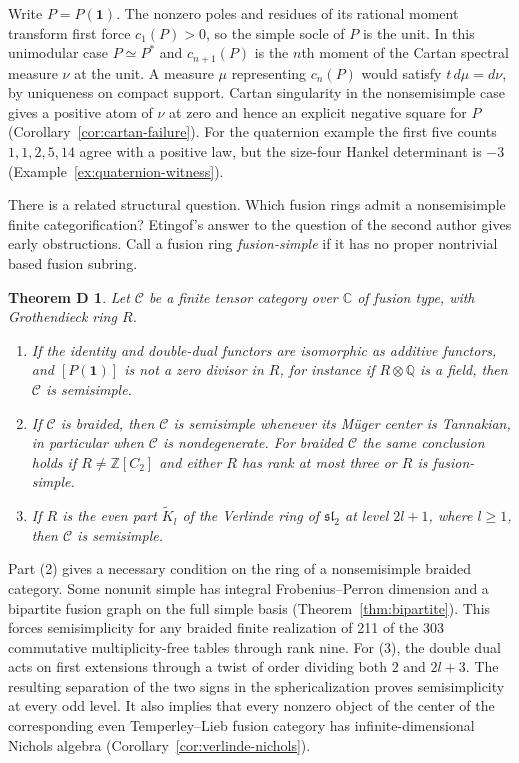 \documentclass[11pt,reqno]{amsart}
\newtheorem*{theoremD}{Theorem D}
\theoremstyle{definition}
\newcommand{\one}{\mathbf 1}
\newcommand{\C}{\mathcal C}
\newcommand{\CC}{\mathbb C}
\newcommand{\ZZ}{\mathbb Z}
\begin{document}
Write $P=P(\one)$. The nonzero poles and residues of its rational moment transform first force $c_1(P)>0$, so the simple socle of $P$ is the unit. In this unimodular case $P\simeq P^*$ and $c_{n+1}(P)$ is the $n$th moment of the Cartan spectral measure $\nu$ at the unit. A measure $\mu$ representing $c_n(P)$ would satisfy $t\,d\mu=d\nu$, by uniqueness on compact support. Cartan singularity in the nonsemisimple case \cite[Theorem~6.6.1]{EGNO} gives a positive atom of $\nu$ at zero and hence an explicit negative square for $P$ (Corollary~\ref{cor:cartan-failure}). For the quaternion example the first five counts $1,1,2,5,14$ agree with a positive law, but the size-four Hankel determinant is $-3$ (Example~\ref{ex:quaternion-witness}).

There is a related structural question. Which fusion rings admit a nonsemisimple finite categorification? Etingof's answer to the question of the second author \cite{MOEtingof} gives early obstructions. Call a fusion ring \emph{fusion-simple} if it has no proper nontrivial based fusion subring.

\begin{theoremD}
Let $\C$ be a finite tensor category over $\CC$ of fusion type, with Grothendieck ring $R$.
\begin{enumerate}
\item If the identity and double-dual functors are isomorphic as additive functors, and $[P(\one)]$ is not a zero divisor in $R$, for instance if $R\otimes\mathbb Q$ is a field, then $\C$ is semisimple.
\item If $\C$ is braided, then $\C$ is semisimple whenever its M\"uger center is Tannakian, in particular when $\C$ is nondegenerate. For braided $\C$ the same conclusion holds if $R\neq\ZZ[C_2]$ and either $R$ has rank at most three or $R$ is fusion-simple.
\item If $R$ is the even part $\widetilde K_l$ of the Verlinde ring of $\mathfrak{sl}_2$ at level $2l+1$, where $l\ge1$, then $\C$ is semisimple.
\end{enumerate}
\end{theoremD}

Part (2) gives a necessary condition on the ring of a nonsemisimple braided category. Some nonunit simple has integral Frobenius--Perron dimension and a bipartite fusion graph on the full simple basis (Theorem~\ref{thm:bipartite}). This forces semisimplicity for any braided finite realization of 211 of the 303 commutative multiplicity-free tables through rank nine. For (3), the double dual acts on first extensions through a twist of order dividing both $2$ and $2l+3$. The resulting separation of the two signs in the sphericalization proves semisimplicity at every odd level. It also implies that every nonzero object of the center of the corresponding even Temperley--Lieb fusion category has infinite-dimensional Nichols algebra (Corollary~\ref{cor:verlinde-nichols}).
\end{document}
